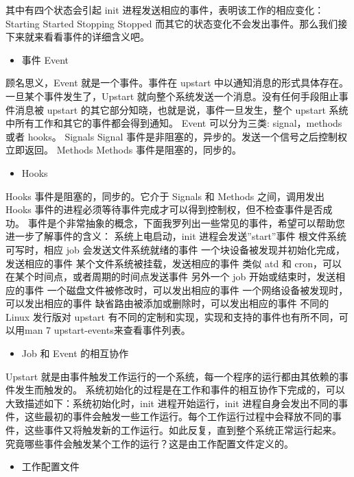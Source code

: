 \documentclass[a4paper,10pt,english]{sphinxmanual}
\begin{document}
其中有四个状态会引起 init 进程发送相应的事件，表明该工作的相应变化：
Starting
Started
Stopping
Stopped
而其它的状态变化不会发出事件。那么我们接下来就来看看事件的详细含义吧。
\begin{itemize}
\item {} 
事件 Event

\end{itemize}

顾名思义，Event 就是一个事件。事件在 upstart 中以通知消息的形式具体存在。一旦某个事件发生了，Upstart 就向整个系统发送一个消息。没有任何手段阻止事件消息被 upstart 的其它部分知晓，也就是说，事件一旦发生，整个 upstart 系统中所有工作和其它的事件都会得到通知。
Event 可以分为三类: signal，methods 或者 hooks。
Signals
Signal 事件是非阻塞的，异步的。发送一个信号之后控制权立即返回。
Methods
Methods 事件是阻塞的，同步的。
\begin{itemize}
\item {} 
Hooks

\end{itemize}

Hooks 事件是阻塞的，同步的。它介于 Signals 和 Methods 之间，调用发出 Hooks 事件的进程必须等待事件完成才可以得到控制权，但不检查事件是否成功。
事件是个非常抽象的概念，下面我罗列出一些常见的事件，希望可以帮助您进一步了解事件的含义：
系统上电启动，init 进程会发送”start”事件
根文件系统可写时，相应 job 会发送文件系统就绪的事件
一个块设备被发现并初始化完成，发送相应的事件
某个文件系统被挂载，发送相应的事件
类似 atd 和 cron，可以在某个时间点，或者周期的时间点发送事件
另外一个 job 开始或结束时，发送相应的事件
一个磁盘文件被修改时，可以发出相应的事件
一个网络设备被发现时，可以发出相应的事件
缺省路由被添加或删除时，可以发出相应的事件
不同的 Linux 发行版对 upstart 有不同的定制和实现，实现和支持的事件也有所不同，可以用man 7 upstart-events来查看事件列表。
\begin{itemize}
\item {} 
Job 和 Event 的相互协作

\end{itemize}

Upstart 就是由事件触发工作运行的一个系统，每一个程序的运行都由其依赖的事件发生而触发的。
系统初始化的过程是在工作和事件的相互协作下完成的，可以大致描述如下：系统初始化时，init 进程开始运行，init 进程自身会发出不同的事件，这些最初的事件会触发一些工作运行。每个工作运行过程中会释放不同的事件，这些事件又将触发新的工作运行。如此反复，直到整个系统正常运行起来。
究竟哪些事件会触发某个工作的运行？这是由工作配置文件定义的。
\begin{itemize}
\item {} 
工作配置文件

\end{itemize}
\end{document}
